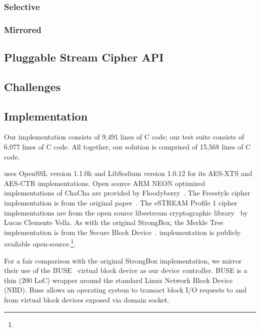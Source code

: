 \subsubsection{Selective}


\subsubsection{Mirrored}


\subsection{Pluggable Stream Cipher API}


\subsection{Challenges}



\subsection{Implementation}

Our \SYSTEM{} implementation consists of 9,491 lines of C code; our test suite
consists of 6,077 lines of C code. All together, our solution is comprised of
15,568 lines of C code.

\SYSTEM{} uses OpenSSL version 1.1.0h and LibSodium version 1.0.12 for its
AES-XTS and AES-CTR implementations. Open source ARM NEON optimized
implementations of ChaCha are provided by Floodyberry~\cite{Floodyberry}. The
Freestyle cipher implementation is from the original paper~\cite{Freestyle}. The
eSTREAM Profile 1 cipher implementations are from the open source libestream
cryptographic library~\cite{libestream} by Lucas Clemente Vella. As with the
original StrongBox, the Merkle Tree implementation is from the Secure Block
Device~\cite{SBD}. \SYSTEM{} implementation is publicly available
open-source.\footnote{\SystemURI}.

For a fair comparison with the original StrongBox implementation, we mirror
their use of the BUSE~\cite{BUSE} virtual block device as our device controller.
BUSE is a thin (200 LoC) wrapper around the standard Linux Network Block Device
(NBD). Buse allows an operating system to transact block I/O requests to and
from virtual block devices exposed via domain socket.

